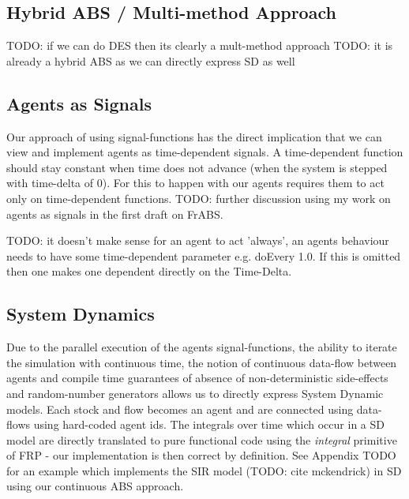 \subsection{Hybrid ABS / Multi-method Approach}
TODO: if we can do DES then its clearly a mult-method approach
TODO: it is already a hybrid ABS as we can directly express SD as well

\subsection{Agents as Signals}
Our approach of using signal-functions has the direct implication that we can view and implement agents as time-dependent signals. A time-dependent function should stay constant when time does not advance (when the system is stepped with time-delta of 0). For this to happen with our agents requires them to act only on time-dependent functions. TODO: further discussion using my work on agents as signals in the first draft on FrABS.

TODO: it doesn't make sense for an agent to act 'always', an agents behaviour needs to have some time-dependent parameter e.g. doEvery 1.0. If this is omitted then one makes one dependent directly on the Time-Delta.

\subsection{System Dynamics}
Due to the parallel execution of the agents signal-functions, the ability to iterate the simulation with continuous time, the notion of continuous data-flow between agents and compile time guarantees of absence of non-deterministic side-effects and random-number generators allows us to directly express System Dynamic models.
Each stock and flow becomes an agent and are connected using data-flows using hard-coded agent ids. The integrals over time which occur in a SD model are directly translated to pure functional code using the \textit{integral} primitive of FRP - our implementation is then correct by definition.
See Appendix TODO for an example which implements the SIR model (TODO: cite mckendrick) in SD using our continuous ABS approach.

